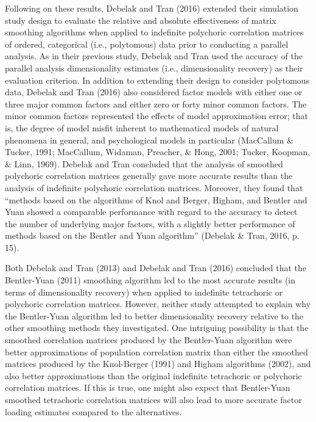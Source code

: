 \documentclass[
  english,
  man]{apa6}
\begin{document}
Following on these results, Debelak and Tran (2016) extended their simulation study design to evaluate the relative and absolute effectiveness of matrix smoothing algorithms when applied to indefinite polychoric correlation matrices of ordered, categorical (i.e., polytomous) data prior to conducting a parallel analysis. As in their previous study, Debelak and Tran used the accuracy of the parallel analysis dimensionality estimates (i.e., dimensionality recovery) as their evaluation criterion. In addition to extending their design to consider polytomous data, Debelak and Tran (2016) also considered factor models with either one or three major common factors and either zero or forty minor common factors. The minor common factors represented the effects of model approximation error; that is, the degree of model misfit inherent to mathematical models of natural phenomena in general, and psychological models in particular (MacCallum \& Tucker, 1991; MacCallum, Widaman, Preacher, \& Hong, 2001; Tucker, Koopman, \& Linn, 1969). Debelak and Tran concluded that the analysis of smoothed polychoric correlation matrices generally gave more accurate results than the analysis of indefinite polychoric correlation matrices. Moreover, they found that \enquote{methods based on the algorithms of Knol and Berger, Higham, and Bentler and Yuan showed a comparable performance with regard to the accuracy to detect the number of underlying major factors, with a slightly better performance of methods based on the Bentler and Yuan algorithm} (Debelak \& Tran, 2016, p. 15).

Both Debelak and Tran (2013) and Debelak and Tran (2016) concluded that the Bentler-Yuan (2011) smoothing algorithm led to the most accurate results (in terms of dimensionality recovery) when applied to indefinite tetrachoric or polychoric correlation matrices. However, neither study attempted to explain why the Bentler-Yuan algorithm led to better dimensionality recovery relative to the other smoothing methods they investigated. One intriguing possibility is that the smoothed correlation matrices produced by the Bentler-Yuan algorithm were better approximations of population correlation matrix than either the smoothed matrices produced by the Knol-Berger (1991) and Higham algorithms (2002), and also better approximations than the original indefinite tetrachoric or polychoric correlation matrices. If this is true, one might also expect that Bentler-Yuan smoothed tetrachoric correlation matrices will also lead to more accurate factor loading estimates compared to the alternatives.
\end{document}
